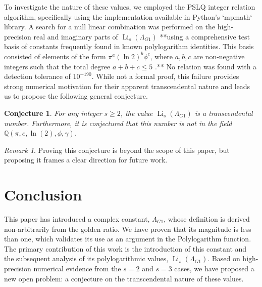\documentclass{amsart}
\theoremstyle{plain}
\newtheorem{conjecture}[theorem]{Conjecture}
\theoremstyle{definition}
\theoremstyle{remark}
\newtheorem*{remark}{Remark}
\DeclareMathOperator{\Li}{Li} %
\newcommand{\LambdaG}{\Lambda_{G1}}
\newcommand{\phiG}{\phi}
\begin{document}
To investigate the nature of these values, we employed the PSLQ integer relation algorithm, specifically using the implementation available in Python's `mpmath` library. A search for a null linear combination was performed on the high-precision real and imaginary parts of $\Li_s(\LambdaG)$ **using a comprehensive test basis of constants frequently found in known polylogarithm identities. This basis consisted of elements of the form $\pi^a (\ln 2)^b \phi^c$, where $a,b,c$ are non-negative integers such that the total degree $a+b+c \le 5$ .** No relation was found with a detection tolerance of $10^{-190}$. While not a formal proof, this failure provides strong numerical motivation for their apparent transcendental nature and leads us to propose the following general conjecture.
\begin{conjecture}
For any integer $s \ge 2$, the value $\Li_s(\LambdaG)$ is a transcendental number. Furthermore, it is conjectured that this number is not in the field $\mathbb{Q}(\pi, e, \ln(2), \phiG, \gamma)$.
\end{conjecture}
\begin{remark}
Proving this conjecture is beyond the scope of this paper, but proposing it frames a clear direction for future work.
\end{remark}

\section{Conclusion}
This paper has introduced a complex constant, $\LambdaG$, whose definition is derived non-arbitrarily from the golden ratio. We have proven that its magnitude is less than one, which validates its use as an argument in the Polylogarithm function. The primary contribution of this work is the introduction of this constant and the subsequent analysis of its polylogarithmic values, $\Li_s(\LambdaG)$. Based on high-precision numerical evidence from the $s=2$ and $s=3$ cases, we have proposed a new open problem: a conjecture on the transcendental nature of these values.

\end{document}
